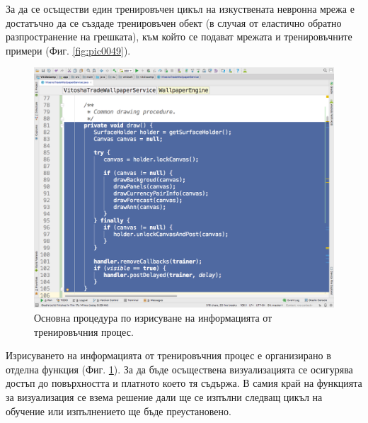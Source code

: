 \documentclass[book,14pt,oneside,openany]{memoir}
\begin{document}
За да се осъществи един тренировъчен цикъл на изкуствената невронна мрежа е достатъчно да се създаде тренировъчен обект (в случая от еластично обратно разпространение на грешката), към който се подават мрежата и тренировъчните примери (Фиг. \ref{fig:pic0049}).

\begin{figure}[h]
  \centering
  \includegraphics[height=0.45\pdfpageheight]{pic0050}
  \caption{Основна процедура по изрисуване на информацията от тренировъчния процес.}
\label{fig:pic0050}
\end{figure}
\FloatBarrier

Изрисуването на информацията от тренировъчния процес е организирано в отделна функция (Фиг. \ref{fig:pic0050}). За да бъде осъществена визуализацията се осигурява достъп до повърхността и платното което тя съдържа. В самия край на функцията за визуализация се взема решение дали ще се изпълни следващ цикъл на обучение или изпълнението ще бъде преустановено. 
\end{document}
